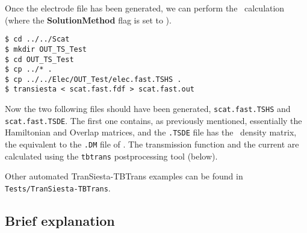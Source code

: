 Once the electrode file has been generated, we can perform the \tsiesta\ 
calculation (where the \textbf{SolutionMethod} flag is set
to ).

\begin{verbatim}
$ cd ../../Scat
$ mkdir OUT_TS_Test
$ cd OUT_TS_Test
$ cp ../* .
$ cp ../../Elec/OUT_Test/elec.fast.TSHS .
$ transiesta < scat.fast.fdf > scat.fast.out
\end{verbatim}

Now the two following files should have been generated, \texttt{scat.fast.TSHS} 
and \texttt{scat.fast.TSDE}. The first one contains, as previously mentioned, 
essentially the Hamiltonian and Overlap matrices, and the \texttt{.TSDE} file 
has the \tsiesta\ density matrix, the equivalent to the \texttt{.DM} 
file of \siesta. The transmission function and the current are calculated 
using the \texttt{tbtrans} postprocessing tool (below).

Other automated TranSiesta-TBTrans examples can be found in
\texttt{Tests/TranSiesta-TBTrans}.

\subsection{Brief explanation}


